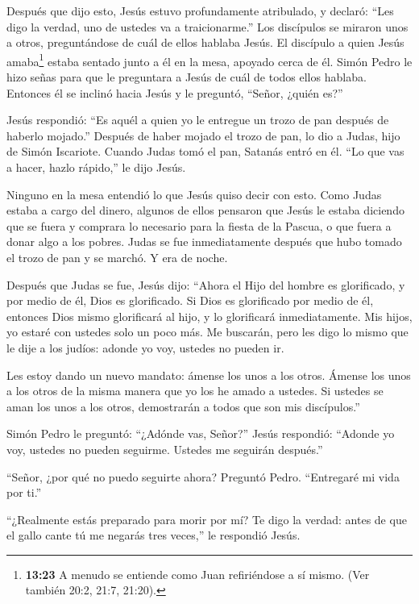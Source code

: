  Después que dijo esto, Jesús estuvo profundamente
atribulado, y declaró: ``Les digo la verdad, uno de ustedes va a
traicionarme.''  Los discípulos se miraron unos a otros,
preguntándose de cuál de ellos hablaba Jesús.  El discípulo
a quien Jesús amaba\footnote{\textbf{13:23} A menudo se entiende como
  Juan refiriéndose a sí mismo. (Ver también 20:2, 21:7, 21:20).} estaba
sentado junto a él en la mesa, apoyado cerca de él.  Simón
Pedro le hizo señas para que le preguntara a Jesús de cuál de todos
ellos hablaba.  Entonces él se inclinó hacia Jesús y le
preguntó, ``Señor, ¿quién es?''

 Jesús respondió: ``Es aquél a quien yo le entregue un
trozo de pan después de haberlo mojado.''  Después de haber
mojado el trozo de pan, lo dio a Judas, hijo de Simón Iscariote. Cuando
Judas tomó el pan, Satanás entró en él. ``Lo que vas a hacer, hazlo
rápido,'' le dijo Jesús.

 Ninguno en la mesa entendió lo que Jesús quiso decir con
esto.  Como Judas estaba a cargo del dinero, algunos de
ellos pensaron que Jesús le estaba diciendo que se fuera y comprara lo
necesario para la fiesta de la Pascua, o que fuera a donar algo a los
pobres.  Judas se fue inmediatamente después que hubo
tomado el trozo de pan y se marchó. Y era de noche.

 Después que Judas se fue, Jesús dijo: ``Ahora el Hijo del
hombre es glorificado, y por medio de él, Dios es glorificado.
 Si Dios es glorificado por medio de él, entonces Dios
mismo glorificará al hijo, y lo glorificará inmediatamente.
 Mis hijos, yo estaré con ustedes solo un poco más. Me
buscarán, pero les digo lo mismo que le dije a los judíos: adonde yo
voy, ustedes no pueden ir.

 Les estoy dando un nuevo mandato: ámense los unos a los
otros. Ámense los unos a los otros de la misma manera que yo los he
amado a ustedes.  Si ustedes se aman los unos a los otros,
demostrarán a todos que son mis discípulos.''

 Simón Pedro le preguntó: ``¿Adónde vas, Señor?'' Jesús
respondió: ``Adonde yo voy, ustedes no pueden seguirme. Ustedes me
seguirán después.''

 ``Señor, ¿por qué no puedo seguirte ahora? Preguntó Pedro.
``Entregaré mi vida por ti.''

 ``¿Realmente estás preparado para morir por mí? Te digo la
verdad: antes de que el gallo cante tú me negarás tres veces,'' le
respondió Jesús.

